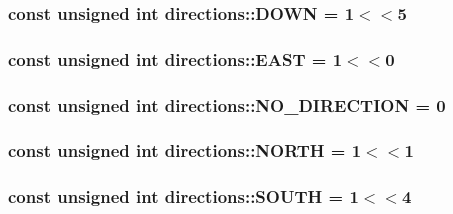 \hypertarget{namespacedirections_ac5b0521b6f55c6c27dd493c816eaf61a}{
\subsubsection[{D\-O\-W\-N}]{\setlength{\rightskip}{0pt plus 5cm}const unsigned int directions\-::\-D\-O\-W\-N = 1$<$$<$5}}\label{namespacedirections_ac5b0521b6f55c6c27dd493c816eaf61a}
\hypertarget{namespacedirections_aaac74a9680a4a4485ea7966d9cc1e7a0}{
\subsubsection[{E\-A\-S\-T}]{\setlength{\rightskip}{0pt plus 5cm}const unsigned int directions\-::\-E\-A\-S\-T = 1$<$$<$0}}\label{namespacedirections_aaac74a9680a4a4485ea7966d9cc1e7a0}
\hypertarget{namespacedirections_a07f0f35a8e192bdbfbe343b4cc3ac5f0}{
\subsubsection[{N\-O\-\_\-\-D\-I\-R\-E\-C\-T\-I\-O\-N}]{\setlength{\rightskip}{0pt plus 5cm}const unsigned int directions\-::\-N\-O\-\_\-\-D\-I\-R\-E\-C\-T\-I\-O\-N = 0}}\label{namespacedirections_a07f0f35a8e192bdbfbe343b4cc3ac5f0}
\hypertarget{namespacedirections_abe28a39304326df4cd876a6f8267b8a0}{
\subsubsection[{N\-O\-R\-T\-H}]{\setlength{\rightskip}{0pt plus 5cm}const unsigned int directions\-::\-N\-O\-R\-T\-H = 1$<$$<$1}}\label{namespacedirections_abe28a39304326df4cd876a6f8267b8a0}
\hypertarget{namespacedirections_a01f808fbd532b480f6df835ba039eeb3}{
\subsubsection[{S\-O\-U\-T\-H}]{\setlength{\rightskip}{0pt plus 5cm}const unsigned int directions\-::\-S\-O\-U\-T\-H = 1$<$$<$4}}\label{namespacedirections_a01f808fbd532b480f6df835ba039eeb3}
